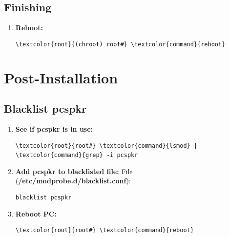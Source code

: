 \documentclass[10pt, a4paper, onecolumn, oneside, titlepage, openany]{book}
\begin{document}
\section{Finishing}
\begin{enumerate}
    \item \textbf{Reboot:}
\begin{Verbatim}[commandchars=\\\{\}]
\textcolor{root}{(chroot) root#} \textcolor{command}{reboot}
\end{Verbatim}
\end{enumerate}


\chapter{Post-Installation}
\section{Blacklist pcspkr}
\begin{enumerate}
    \item \textbf{See if pcspkr is in use:}
\begin{Verbatim}[commandchars=\\\{\}]
\textcolor{root}{root#} \textcolor{command}{lsmod} | \textcolor{command}{grep} -i pcspkr
\end{Verbatim}
    \item \textbf{Add pcspkr to blacklisted file:}
\newline File (\textbf{\textcolor{file}{/etc/modprobe.d/blacklist.conf}}):
\begin{Verbatim}[commandchars=\\\{\}]
blacklist pcspkr
\end{Verbatim}
    \item \textbf{Reboot PC:}
\begin{Verbatim}[commandchars=\\\{\}]
\textcolor{root}{root#} \textcolor{command}{reboot}
\end{Verbatim}
\end{enumerate}
\end{document}
